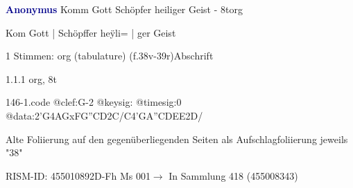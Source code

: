 \documentclass[twocolumn]{book}
\begin{document}
\par \vspace{7pt} \textcolor{darkblue}{\textbf{Anonymus  }}\hfillplus{\textbf{[146]}}\newline Komm Gott Schöpfer heiliger Geist - 8t\newline org
\par \begin{itshape}[f.38v, at left:] Kom Gott | Schöpffer heÿli= | ger Geist\end{itshape} 
\par \textcolor{darkblue}{}  1 Stimmen: org (tabulature)  (f.38v-39r)\newline Abschrift
\par 1.1.1  org, 8t  
\begin{filecontents*}{146-1.code}
@clef:G-2
@keysig:
@timesig:0
@data:2'G4AGxFG''CD2C/C4'GA''CDEE2D/
\end{filecontents*}
\newline
%
\par Alte Foliierung auf den gegenüberliegenden Seiten als Aufschlagfoliierung jeweils "38"
\par RISM-ID: 455010892\newline D-Fh  Ms 001\newline $\rightarrow$ In Sammlung 418 (455008343)
      
\end{document}

